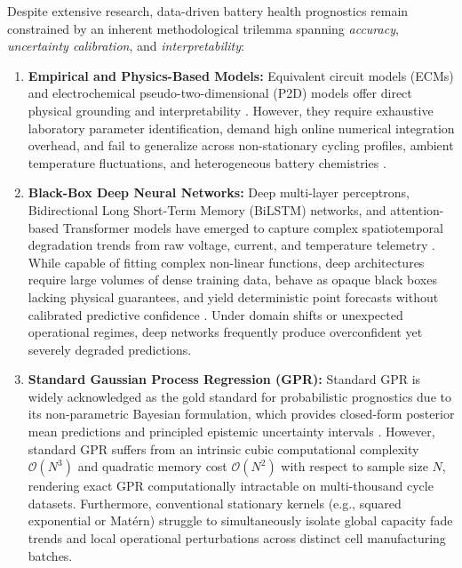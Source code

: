 \documentclass[a4paper,fleqn]{cas-sc}
\begin{document}
Despite extensive research, data-driven battery health prognostics remain constrained by an inherent methodological trilemma spanning \textit{accuracy}, \textit{uncertainty calibration}, and \textit{interpretability}:
\begin{enumerate}
    \item \textbf{Empirical and Physics-Based Models:} Equivalent circuit models (ECMs) and electrochemical pseudo-two-dimensional (P2D) models offer direct physical grounding and interpretability \cite{martinez2026sensor, lee2026smartphone}. However, they require exhaustive laboratory parameter identification, demand high online numerical integration overhead, and fail to generalize across non-stationary cycling profiles, ambient temperature fluctuations, and heterogeneous battery chemistries \cite{gupta2026fusion, oconnor2026separating}.
    \item \textbf{Black-Box Deep Neural Networks:} Deep multi-layer perceptrons, Bidirectional Long Short-Term Memory (BiLSTM) networks, and attention-based Transformer models have emerged to capture complex spatiotemporal degradation trends from raw voltage, current, and temperature telemetry \cite{chen2024lstm, zhou2023bilstm, zhao2024stacked, wu2024endcloud, liu2026dualbranch, kim2026uncertainty}. While capable of fitting complex non-linear functions, deep architectures require large volumes of dense training data, behave as opaque black boxes lacking physical guarantees, and yield deterministic point forecasts without calibrated predictive confidence \cite{park2025feature, sun2024interpretable}. Under domain shifts or unexpected operational regimes, deep networks frequently produce overconfident yet severely degraded predictions.
    \item \textbf{Standard Gaussian Process Regression (GPR):} Standard GPR is widely acknowledged as the gold standard for probabilistic prognostics due to its non-parametric Bayesian formulation, which provides closed-form posterior mean predictions and principled epistemic uncertainty intervals \cite{liu2018novel, richardson2019multiscale, yang2018multiscale, li2024lowdim, wang2024bayesian, alvarez2026uncertainty}. However, standard GPR suffers from an intrinsic cubic computational complexity $\mathcal{O}(N^3)$ and quadratic memory cost $\mathcal{O}(N^2)$ with respect to sample size $N$, rendering exact GPR computationally intractable on multi-thousand cycle datasets. Furthermore, conventional stationary kernels (e.g., squared exponential or Matérn) struggle to simultaneously isolate global capacity fade trends and local operational perturbations across distinct cell manufacturing batches.
\end{enumerate}
\end{document}
